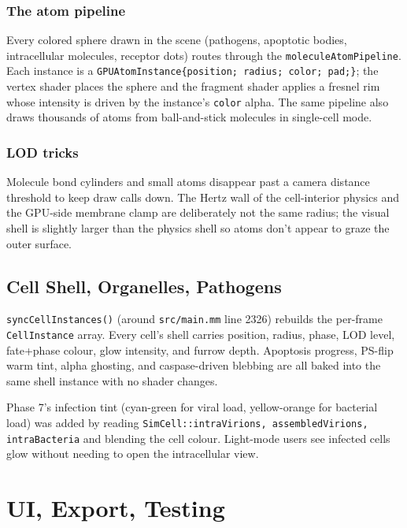 \documentclass[11pt,letterpaper,twoside,openany]{book}
\newcommand{\code}[1]{\texttt{#1}}
\newcommand{\file}[1]{\texttt{\small#1}}
\begin{document}
\section{The atom pipeline}

Every colored sphere drawn in the scene (pathogens, apoptotic
bodies, intracellular molecules, receptor dots) routes through the
\code{moleculeAtomPipeline}. Each instance is a
\code{GPUAtomInstance\{position; radius; color; pad;\}}; the
vertex shader places the sphere and the fragment shader applies a
fresnel rim whose intensity is driven by the instance's
\code{color} alpha. The same pipeline also draws thousands of
atoms from ball-and-stick molecules in single-cell mode.

\section{LOD tricks}

Molecule bond cylinders and small atoms disappear past a camera
distance threshold to keep draw calls down. The Hertz wall of the
cell-interior physics and the GPU-side membrane clamp are
deliberately not the same radius; the visual shell is slightly
larger than the physics shell so atoms don't appear to graze the
outer surface.

\chapter{Cell Shell, Organelles, Pathogens}
\label{ch:rendercell}

\code{syncCellInstances()} (around \file{src/main.mm} line 2326)
rebuilds the per-frame \code{CellInstance} array. Every cell's
shell carries position, radius, phase, LOD level, fate+phase colour,
glow intensity, and furrow depth. Apoptosis progress, PS-flip warm
tint, alpha ghosting, and caspase-driven blebbing are all baked
into the same shell instance with no shader changes.

Phase 7's infection tint (cyan-green for viral load, yellow-orange
for bacterial load) was added by reading
\code{SimCell::intraVirions, assembledVirions, intraBacteria} and
blending the cell colour. Light-mode users see infected cells glow
without needing to open the intracellular view.

\part{UI, Export, Testing}
\end{document}
